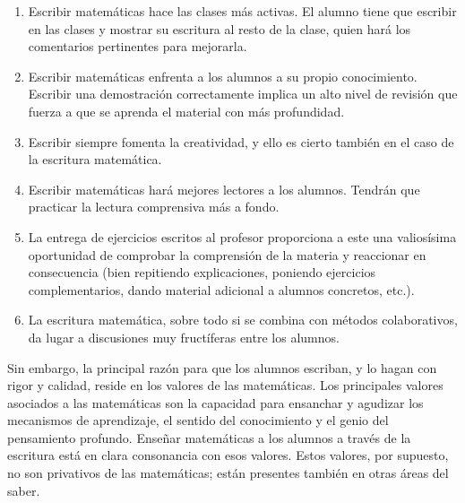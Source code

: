 \begin{enumerate}
    \item Escribir matemáticas hace las clases más activas.
    El alumno tiene que escribir en las clases y mostrar su escritura al resto de la clase, quien hará los comentarios pertinentes para mejorarla.
    \item Escribir matemáticas enfrenta a los alumnos a su propio conocimiento.
    Escribir una demostración correctamente implica un alto nivel de revisión que fuerza a que se aprenda el material con más profundidad.
    \item Escribir siempre fomenta la creatividad, y ello es cierto también en el caso de la escritura matemática.
    \item Escribir matemáticas hará mejores lectores a los alumnos.
    Tendrán que practicar la lectura comprensiva más a fondo.
    \item La entrega de ejercicios escritos al profesor proporciona a este una valiosísima oportunidad de comprobar la comprensión de la materia y reaccionar en consecuencia (bien repitiendo explicaciones, poniendo ejercicios complementarios, dando material adicional a alumnos concretos, etc.).
    \item La escritura matemática, sobre todo si se combina con métodos colaborativos, da lugar a discusiones muy fructíferas entre los alumnos.
\end{enumerate}

Sin embargo, la principal razón para que los alumnos escriban, y lo hagan con rigor y calidad, reside en los valores de las matemáticas.
Los principales valores asociados a las matemáticas son la capacidad para ensanchar y agudizar los mecanismos de aprendizaje, el sentido del conocimiento y el genio del pensamiento profundo.
Enseñar matemáticas a los alumnos a través de la escritura está en clara consonancia con esos valores.
Estos valores, por supuesto, no son privativos de las matemáticas; están presentes también en otras áreas del saber.
